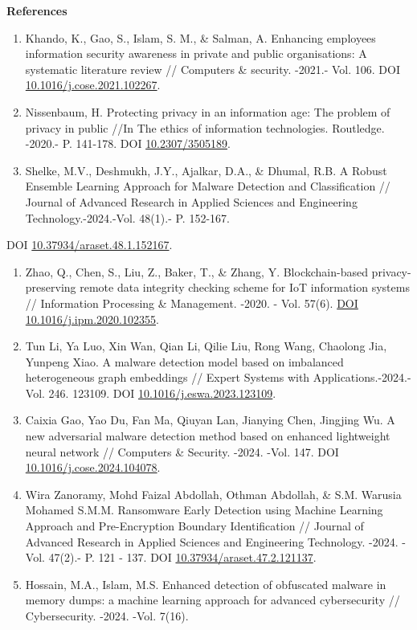 \begin{center}
{\bfseries References}
\end{center}

\begin{enumerate}
\def\labelenumi{\arabic{enumi}.}
\item
  Khando, K., Gao, S., Islam, S. M., \& Salman, A. Enhancing employees
  information security awareness in private and public organisations: A
  systematic literature review // Computers \& security. -2021.- Vol.
  106. DOI
  \href{https://doi.org/10.1016/j.cose.2021.102267}{10.1016/j.cose.2021.102267}.
\item
  Nissenbaum, H. Protecting privacy in an information age: The problem
  of privacy in public //In The ethics of information technologies.
  Routledge. -2020.- P. 141-178. DOI
  \href{https://doi.org/10.2307/3505189}{10.2307/3505189}.
\item
  Shelke, M.V., Deshmukh, J.Y., Ajalkar, D.A., \& Dhumal, R.B. A Robust
  Ensemble Learning Approach for Malware Detection and Classification //
  Journal of Advanced Research in Applied Sciences and Engineering
  Technology.-2024.-Vol. 48(1).- P. 152-167.
\end{enumerate}

DOI
\href{https://doi.org/10.37934/araset.48.1.152167}{10.37934/araset.48.1.152167}.

\begin{enumerate}
\def\labelenumi{\arabic{enumi}.}
\setcounter{enumi}{3}
\item
  Zhao, Q., Chen, S., Liu, Z., Baker, T., \& Zhang, Y. Blockchain-based
  privacy-preserving remote data integrity checking scheme for IoT
  information systems // Information Processing \& Management. -2020. -
  Vol. 57(6). \href{https://doi.org/10.1016/j.ipm.2020.102355}{DOI
  10.1016/j.ipm.2020.102355}.
\item
  Tun Li, Ya Luo, Xin Wan, Qian Li, Qilie Liu, Rong Wang, Chaolong Jia,
  Yunpeng Xiao. A malware detection model based on imbalanced
  heterogeneous graph embeddings // Expert Systems with
  Applications.-2024.-Vol. 246. 123109. DOI
  \href{https://doi.org/10.1016/j.eswa.2023.123109}{10.1016/j.eswa.2023.123109}.
\item
  Caixia Gao, Yao Du, Fan Ma, Qiuyan Lan, Jianying Chen, Jingjing Wu. A
  new adversarial malware detection method based on enhanced lightweight
  neural network // Computers \& Security. -2024. -Vol. 147. DOI
  \href{https://doi.org/10.1016/j.cose.2024.104078}{10.1016/j.cose.2024.104078}.
\item
  Wira Zanoramy, Mohd Faizal Abdollah, Othman Abdollah, \& S.M. Warusia
  Mohamed S.M.M. Ransomware Early Detection using Machine Learning
  Approach and Pre-Encryption Boundary Identification // Journal of
  Advanced Research in Applied Sciences and Engineering Technology.
  -2024. -Vol. 47(2).- P. 121 - 137. DOI
  \href{https://doi.org/10.37934/araset.47.2.121137}{10.37934/araset.47.2.121137}.
\item
  Hossain, M.A., Islam, M.S. Enhanced detection of obfuscated malware in
  memory dumps: a machine learning approach for advanced cybersecurity
  // Cybersecurity. -2024. -Vol. 7(16).
\end{enumerate}

